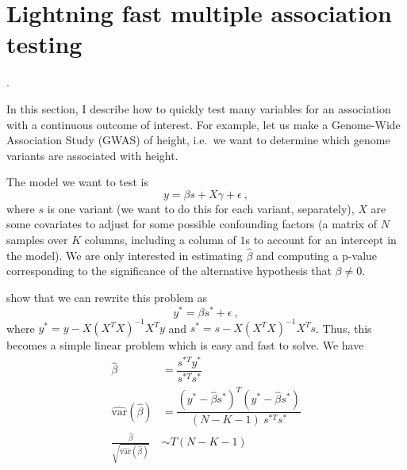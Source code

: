 \section*{Lightning fast multiple association testing}.

In this section, I describe how to quickly test many variables for an association with a continuous outcome of interest. For example, let us make a Genome-Wide Association Study (GWAS) of height, i.e.\ we want to determine which genome variants are associated with height.

The model we want to test is $$y = \beta s + X \gamma + \epsilon~,$$ where $s$ is one variant (we want to do this for each variant, separately), $X$ are some covariates to adjust for some possible confounding factors (a matrix of $N$ samples over $K$ columns, including a column of $1$s to account for an intercept in the model). 
We are only interested in estimating $\hat{\beta}$ and computing a p-value corresponding to the significance of the alternative hypothesis that $\beta \neq 0$.

\cite{sikorska2013gwas} show that we can rewrite this problem as $$y^* = \beta s^* + \epsilon~,$$ where $y^* = y - X (X^T X)^{-1} X^T y$ and $s^* = s - X (X^T X)^{-1} X^T s$. Thus, this becomes a simple linear problem which is easy and fast to solve. We have
\begin{align*}
\hat{\beta} &= \dfrac{s^{*T} y^*}{s^{*T} s^*} \\
\widehat{\text{var}}(\hat{\beta}) &= \dfrac{(y^* - \hat{\beta} s^*)^T (y^* - \hat{\beta} s^*)}{(N - K - 1) ~ s^{*T} s^*} \\
\frac{\hat{\beta}}{\sqrt{\widehat{\text{var}}(\hat{\beta})}} &\sim T(N - K - 1)
\end{align*}

